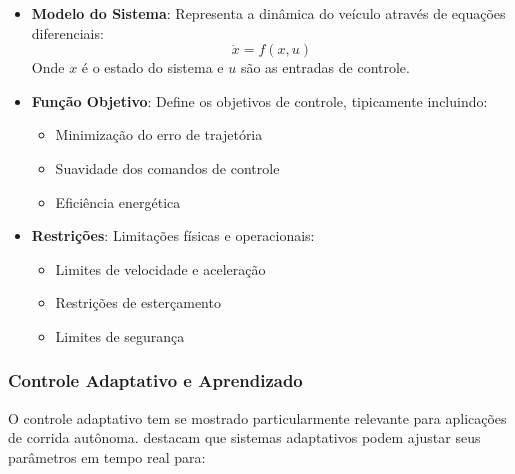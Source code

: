 \begin{itemize}
    \item \textbf{Modelo do Sistema}: Representa a dinâmica do veículo através de equações diferenciais:
          \begin{equation}
              \dot{x} = f(x,u)
          \end{equation}
          Onde $x$ é o estado do sistema e $u$ são as entradas de controle.

    \item \textbf{Função Objetivo}: Define os objetivos de controle, tipicamente incluindo:
          \begin{itemize}
              \item Minimização do erro de trajetória
              \item Suavidade dos comandos de controle
              \item Eficiência energética
          \end{itemize}

    \item \textbf{Restrições}: Limitações físicas e operacionais:
          \begin{itemize}
              \item Limites de velocidade e aceleração
              \item Restrições de esterçamento
              \item Limites de segurança
          \end{itemize}
\end{itemize}

\subsubsection{Controle Adaptativo e Aprendizado}

O controle adaptativo tem se mostrado particularmente relevante para aplicações
de corrida autônoma. \cite{Karaman2011Optimal} destacam que sistemas
adaptativos podem ajustar seus parâmetros em tempo real para:

